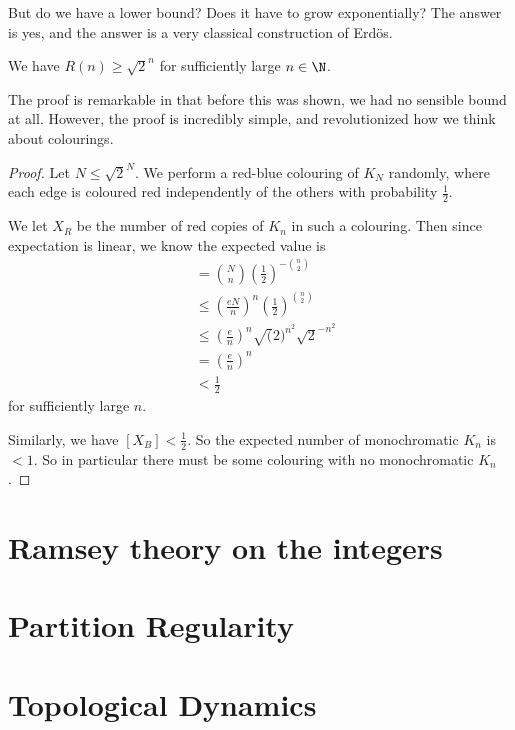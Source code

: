 \documentclass[a4paper]{article}
\begin{document}
But do we have a lower bound? Does it have to grow exponentially? The answer is yes, and the answer is a very classical construction of Erd\"os.

\begin{thm}
  We have $R(n) \geq \sqrt{2}^n$ for sufficiently large $n \in \N$.
\end{thm}
The proof is remarkable in that before this was shown, we had no sensible bound at all. However, the proof is incredibly simple, and revolutionized how we think about colourings.

\begin{proof}
  Let $N \leq \sqrt{2}^N$. We perform a red-blue colouring of $K_N$ randomly, where each edge is coloured red independently of the others with probability $\frac{1}{2}$.

  We let $X_R$ be the number of red copies of $K_n$ in such a colouring. Then since expectation is linear, we know the expected value is
  \begin{align*}
    [X_R] &= \binom{N}{n} \left(\frac{1}{2}\right)^{-\binom{n}{2}}\\
    &\leq \left(\frac{eN}{n}\right)^n \left(\frac{1}{2}\right)^{\binom{n}{2}}\\
    &\leq \left(\frac{e}{n}\right)^n \sqrt(2)^{n^2} \sqrt{2}^{-n^2}\\
    &= \left(\frac{e}{n}\right)^{n}\\
    &< \frac{1}{2}
  \end{align*}
  for sufficiently large $n$.

  Similarly, we have $[X_B] < \frac{1}{2}$. So the expected number of monochromatic $K_n$ is $< 1$. So in particular there must be some colouring with no monochromatic $K_n$.
\end{proof}
\section{Ramsey theory on the integers}
\section{Partition Regularity}
\section{Topological Dynamics}

\printindex
\end{document}
